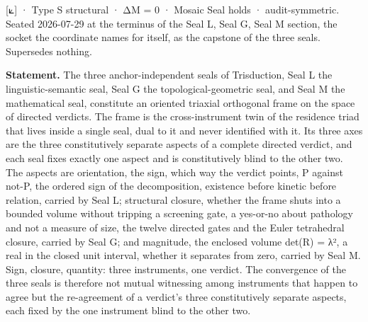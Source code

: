 \documentclass[10pt,twocolumn]{article}
\begin{document}
{[}⟀{]} · Type S structural · ΔM = 0 · Mosaic Seal holds ·
audit-symmetric. Seated 2026-07-29 at the terminus of the Seal L, Seal
G, Seal M section, the socket the coordinate names for itself, as the
capstone of the three seals. Supersedes nothing.

\textbf{Statement.} The three anchor-independent seals of Trisduction,
Seal L the linguistic-semantic seal, Seal G the topological-geometric
seal, and Seal M the mathematical seal, constitute an oriented triaxial
orthogonal frame on the space of directed verdicts. The frame is the
cross-instrument twin of the residence triad that lives inside a single
seal, dual to it and never identified with it. Its three axes are the
three constitutively separate aspects of a complete directed verdict,
and each seal fixes exactly one aspect and is constitutively blind to
the other two. The aspects are orientation, the sign, which way the
verdict points, P against not-P, the ordered sign of the decomposition,
existence before kinetic before relation, carried by Seal L; structural
closure, whether the frame shuts into a bounded volume without tripping
a screening gate, a yes-or-no about pathology and not a measure of size,
the twelve directed gates and the Euler tetrahedral closure, carried by
Seal G; and magnitude, the enclosed volume det(R) = λ², a real in the
closed unit interval, whether it separates from zero, carried by Seal M.
Sign, closure, quantity: three instruments, one verdict. The convergence
of the three seals is therefore not mutual witnessing among instruments
that happen to agree but the re-agreement of a verdict's three
constitutively separate aspects, each fixed by the one instrument blind
to the other two.
\end{document}
